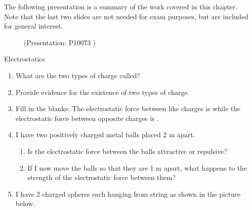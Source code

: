         \label{m38781*eip-152}The following presentation is a summary of the work covered in this chapter. Note that the last two slides are not needed for exam purposes, but are included for general interest.\newline
    \setcounter{subfigure}{0}
	\begin{figure}[H] %
    \label{m38781*slidesharemedia}\label{m38781*slideshareflash} { (Presentation:  P10073 )}
 \end{figure}       \par 
    \label{m38781*cid10}
            \begin{eocexercises}{Electrostatics}
            \nopagebreak
      \label{m38781*id202059}\begin{enumerate}[noitemsep, label=\textbf{\arabic*}. ] 
            \label{m38781*uid21}\item What are the two types of charge called?\newline
\label{m38781*uid22}\item Provide evidence for the existence of two types of charge.\newline
\label{m38781*uid23}\item Fill in the blanks: The electrostatic force between like charges is  \uline{\hspace{10ex}}
 while the electrostatic force between opposite charges is  \uline{\hspace{10ex}}
.\newline
\label{m38781*uid24}\item I have two positively charged metal balls placed 2 m apart.
\label{m38781*id202122}\begin{enumerate}[noitemsep, label=\textbf{\alph*}. ] 
            \label{m38781*uid25}\item Is the electrostatic force between the balls attractive or repulsive?
\label{m38781*uid26}\item If I now move the balls so that they are 1 m apart, what happens to the strength of the electrostatic force between them?
\end{enumerate}
        \newline
            \label{m38781*uid27}\item I have 2 charged spheres each hanging from string as shown in the picture below.

\end{enumerate}
\end{eocexercises}
